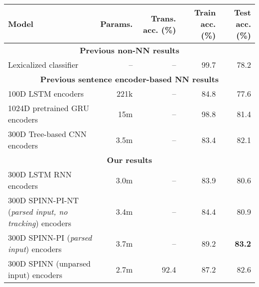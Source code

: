 \documentclass[11pt]{article}
\newcommand\result[1]{\textcolor{red}{\textbf{RESULT NEEDED:} #1}}
\def\ii#1{\textit{#1}}
\begin{document}
\begin{table*}[t]
  \centering\small
  \begin{tabular}{lrrrr} 
    \toprule
Model                   & Params.    & Trans. acc. (\%)  &   Train acc. (\%)  &   Test acc. (\%) \\
\midrule
\multicolumn{5}{c}{\textbf{Previous non-NN results}}\\
Lexicalized classifier \citep{snli:emnlp2015}
                        & --                & --                    &   99.7   &   78.2      \\
\midrule
\multicolumn{5}{c}{\textbf{Previous sentence encoder-based NN results}}\\
100D LSTM encoders \citep{snli:emnlp2015}
                        & 221k               & --               &   84.8   &   77.6      \\
1024D pretrained GRU encoders \citep{DBLP:journals/corr/VendrovKFU15}
                        & 15m                & --              &   98.8   &   81.4       \\
300D Tree-based CNN encoders \citep{mou2015recognizing}
                        & 3.5m                & --             &   83.4   &   82.1       \\
\midrule
\multicolumn{5}{c}{\textbf{Our results}}\\
300D LSTM RNN encoders         & 3.0m                  & --                &   83.9      &   80.6       \\
300D SPINN-PI-NT (\ii{parsed input, no tracking}) encoders
                        & 3.4m                  & --                &   84.4      &   80.9       \\
300D SPINN-PI (\ii{parsed input}) encoders
                        & 3.7m                  & --                &   89.2      &   \textbf{83.2}       \\
300D SPINN (unparsed input) encoders
                        & 2.7m                  & 92.4           &   87.2    &   82.6      \\          

\end{tabular}
\end{table*}
\end{document}
